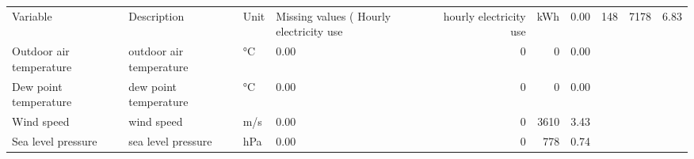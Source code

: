 \begin{tabular}{llllrrl}
\toprule
Variable & Description & Unit & Missing values (%
\midrule
Hourly electricity use & hourly electricity use & kWh & 0.00 & 148 & 7178 & 6.83 \\
Outdoor air temperature & outdoor air temperature & °C & 0.00 & 0 & 0 & 0.00 \\
Dew point temperature & dew point temperature & °C & 0.00 & 0 & 0 & 0.00 \\
Wind speed & wind speed & m/s & 0.00 & 0 & 3610 & 3.43 \\
Sea level pressure & sea level pressure & hPa & 0.00 & 0 & 778 & 0.74 \\
\bottomrule
\end{tabular}
